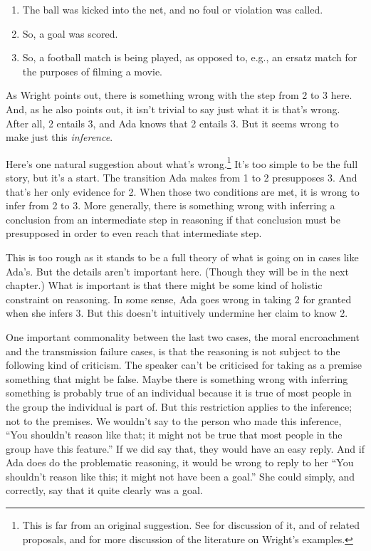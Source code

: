 \documentclass[11pt,]{book}
\providecommand{\tightlist}{%
  \setlength{\itemsep}{0pt}\setlength{\parskip}{0pt}}
\let\rmarkdownfootnote\footnote%
\def\footnote{\protect\rmarkdownfootnote}
\begin{document}
\begin{enumerate}
\def\labelenumi{\arabic{enumi}.}
\tightlist
\item
  The ball was kicked into the net, and no foul or violation was called.
\item
  So, a goal was scored.
\item
  So, a football match is being played, as opposed to, e.g., an ersatz match for the purposes of filming a movie.
\end{enumerate}

As Wright points out, there is something wrong with the step from 2 to 3 here. And, as he also points out, it isn't trivial to say just what it is that's wrong. After all, 2 entails 3, and Ada knows that 2 entails 3. But it seems wrong to make just this \emph{inference}.

Here's one natural suggestion about what's wrong.\footnote{This is far from an original suggestion. See \citet{Weisberg2010} for discussion of it, and of related proposals, and for more discussion of the literature on Wright's examples.} It's too simple to be the full story, but it's a start. The transition Ada makes from 1 to 2 presupposes 3. And that's her only evidence for 2. When those two conditions are met, it is wrong to infer from 2 to 3. More generally, there is something wrong with inferring a conclusion from an intermediate step in reasoning if that conclusion must be presupposed in order to even reach that intermediate step.

This is too rough as it stands to be a full theory of what is going on in cases like Ada's. But the details aren't important here. (Though they will be in the next chapter.) What is important is that there might be some kind of holistic constraint on reasoning. In some sense, Ada goes wrong in taking 2 for granted when she infers 3. But this doesn't intuitively undermine her claim to know 2.

One important commonality between the last two cases, the moral encroachment and the transmission failure cases, is that the reasoning is not subject to the following kind of criticism. The speaker can't be criticised for taking as a premise something that might be false. Maybe there is something wrong with inferring something is probably true of an individual because it is true of most people in the group the individual is part of. But this restriction applies to the inference; not to the premises. We wouldn't say to the person who made this inference, ``You shouldn't reason like that; it might not be true that most people in the group have this feature.'' If we did say that, they would have an easy reply. And if Ada does do the problematic reasoning, it would be wrong to reply to her ``You shouldn't reason like this; it might not have been a goal.'' She could simply, and correctly, say that it quite clearly was a goal.
\end{document}
